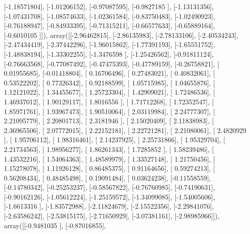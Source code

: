 \documentclass{article}
\begin{document}
       [-1.18571804],
       [-1.01206152],
       [-0.97087595],
       [-0.9827185 ],
       [-1.13131356],
       [-1.07431708],
       [-1.08574633],
       [-1.02361584],
       [-0.83750483],
       [-1.02490923],
       [-0.76188947],
       [-0.84933395],
       [-0.71315211],
       [-0.66577633],
       [-0.65889164],
       [-0.6010105 ]]), array([[-2.96462815],
       [-2.86135983],
       [-2.78133106],
       [-2.40534243],
       [-2.47434419],
       [-2.37442296],
       [-1.96015862],
       [-1.77391193],
       [-1.65551752],
       [-1.48838194],
       [-1.33302255],
       [-1.3476598 ],
       [-1.25426562],
       [-0.91811124],
       [-0.76663568],
       [-0.77087492],
       [-0.47475393],
       [-0.47789159],
       [-0.26758821],
       [ 0.01955685],
       [-0.01418804],
       [ 0.16706496],
       [ 0.27483021],
       [ 0.40832061],
       [ 0.53522202],
       [ 0.77326342],
       [ 0.92188599],
       [ 1.05715985],
       [ 1.04655876],
       [ 1.12121022],
       [ 1.34455677],
       [ 1.25723304],
       [ 1.42909021],
       [ 1.72486536],
       [ 1.46937012],
       [ 1.90129117],
       [ 1.8016556 ],
       [ 1.71712268],
       [ 1.72352547],
       [ 1.85971761],
       [ 1.93967473],
       [ 1.90510064],
       [ 2.03119984],
       [ 2.24777307],
       [ 2.21095779],
       [ 2.20801713],
       [ 2.3181946 ],
       [ 2.15020409],
       [ 2.11838983],
       [ 2.36965506],
       [ 2.07772015],
       [ 2.22152181],
       [ 2.22721281],
       [ 2.21080061],
       [ 2.4820929 ],
       [ 1.95706112],
       [ 1.98316461],
       [ 2.14237925],
       [ 2.25731866],
       [ 1.95329704],
       [ 2.21734563],
       [ 1.98956277],
       [ 1.86261343],
       [ 1.7285852 ],
       [ 1.58239486],
       [ 1.43532216],
       [ 1.54064363],
       [ 1.48589979],
       [ 1.33527148],
       [ 1.21750456],
       [ 1.15278078],
       [ 1.11926128],
       [ 0.86485375],
       [ 0.91164656],
       [ 0.59274213],
       [ 0.56208434],
       [ 0.48485498],
       [ 0.19091484],
       [ 0.03624238],
       [-0.11558559],
       [-0.14780342],
       [-0.25253237],
       [-0.58567822],
       [-0.76760985],
       [-0.74190631],
       [-0.90162126],
       [-1.05612224],
       [-1.25159572],
       [-1.34099085],
       [-1.54005606],
       [-1.6613316 ],
       [-1.83572988],
       [-2.11824679],
       [-2.15522356],
       [-2.29841076],
       [-2.63586242],
       [-2.53815175],
       [-2.71650929],
       [-3.07381161],
       [-2.98985966]]), array([[-0.9481035 ],
       [-0.87016855],
\end{document}
